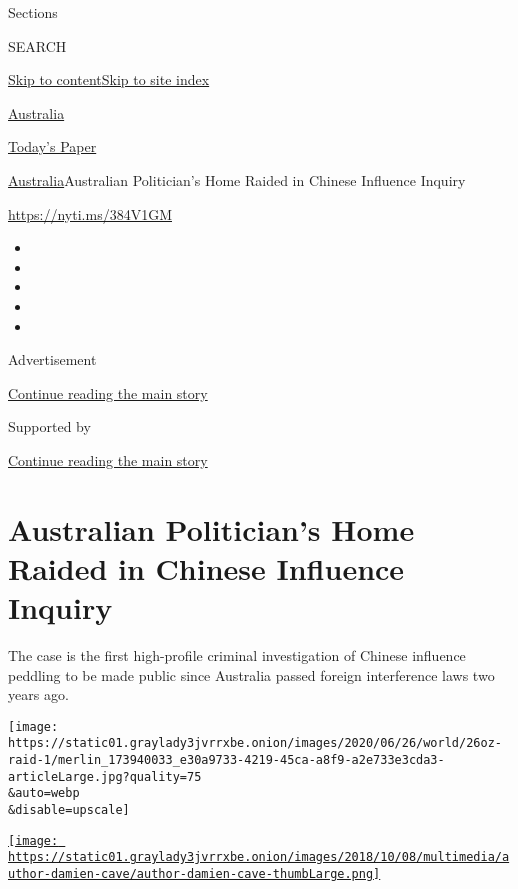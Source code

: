 Sections

SEARCH

\protect\hyperlink{site-content}{Skip to
content}\protect\hyperlink{site-index}{Skip to site index}

\href{https://www.nytimes3xbfgragh.onion/section/world/australia}{Australia}

\href{https://myaccount.nytimes3xbfgragh.onion/auth/login?response_type=cookie\&client_id=vi}{}

\href{https://www.nytimes3xbfgragh.onion/section/todayspaper}{Today's
Paper}

\href{/section/world/australia}{Australia}\textbar{}Australian
Politician's Home Raided in Chinese Influence Inquiry

\url{https://nyti.ms/384V1GM}

\begin{itemize}
\item
\item
\item
\item
\item
\end{itemize}

Advertisement

\protect\hyperlink{after-top}{Continue reading the main story}

Supported by

\protect\hyperlink{after-sponsor}{Continue reading the main story}

\hypertarget{australian-politicians-home-raided-in-chinese-influence-inquiry}{%
\section{Australian Politician's Home Raided in Chinese Influence
Inquiry}\label{australian-politicians-home-raided-in-chinese-influence-inquiry}}

The case is the first high-profile criminal investigation of Chinese
influence peddling to be made public since Australia passed foreign
interference laws two years ago.

\texttt{[image: https://static01.graylady3jvrrxbe.onion/images/2020/06/26/world/26oz-raid-1/merlin\_173940033\_e30a9733-4219-45ca-a8f9-a2e733e3cda3-articleLarge.jpg?quality=75\\\&auto=webp\\\&disable=upscale]}

\href{https://www.nytimes3xbfgragh.onion/by/damien-cave}{\texttt{[image: https://static01.graylady3jvrrxbe.onion/images/2018/10/08/multimedia/author-damien-cave/author-damien-cave-thumbLarge.png]}}

